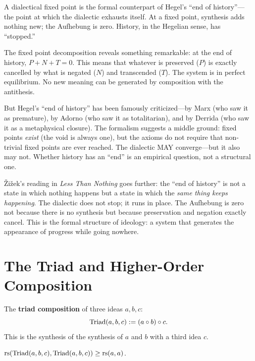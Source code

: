\begin{interpretation}
A dialectical fixed point is the formal counterpart of Hegel's ``end of
history''---the point at which the dialectic exhausts itself. At a fixed
point, synthesis adds nothing new; the Aufhebung is zero. History, in the
Hegelian sense, has ``stopped.''

The fixed point decomposition reveals something remarkable: at the end of
history, $P + N + T = 0$. This means that whatever is preserved ($P$) is
exactly cancelled by what is negated ($N$) and transcended ($T$). The system
is in perfect equilibrium. No new meaning can be generated by composition with
the antithesis.

But Hegel's ``end of history'' has been famously criticized---by Marx (who
saw it as premature), by Adorno (who saw it as totalitarian), and by Derrida
(who saw it as a metaphysical closure). The formalism suggests a middle
ground: fixed points \emph{exist} (the void is always one), but the axioms
do not require that non-trivial fixed points are ever reached. The dialectic
MAY converge---but it also may not. Whether history has an ``end'' is an
empirical question, not a structural one.

\v{Z}i\v{z}ek's reading in \textit{Less Than Nothing} goes further: the
``end of history'' is not a state in which nothing happens but a state in
which the \emph{same thing keeps happening}. The dialectic does not stop;
it runs in place. The Aufhebung is zero not because there is no synthesis
but because preservation and negation exactly cancel. This is the formal
structure of ideology: a system that generates the appearance of progress
while going nowhere.
\end{interpretation}

\section{The Triad and Higher-Order Composition}

\begin{definition}
\label{def:triad-compose}
The \textbf{triad composition} of three ideas $a, b, c$:
\[
\mathrm{Triad}(a, b, c) := (a \circ b) \circ c.
\]
This is the synthesis of the synthesis of $a$ and $b$ with a third idea $c$.
\end{definition}

\begin{theorem}
\label{thm:triad-enriches-first}
$\mathrm{rs}(\mathrm{Triad}(a, b, c), \mathrm{Triad}(a, b, c)) \geq \mathrm{rs}(a, a)$.
\end{theorem}

